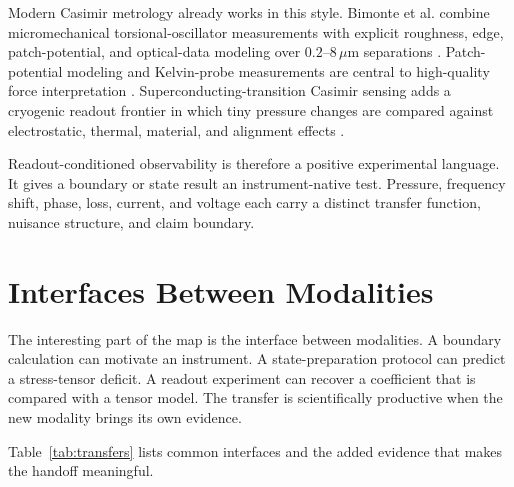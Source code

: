 \documentclass[11pt]{article}
\newcommand{\Tab}{Table}
\newcommand{\um}{\,\mu\mathrm{m}}
\begin{document}
Modern Casimir metrology already works in this style. Bimonte et al. combine
micromechanical torsional-oscillator measurements with explicit roughness,
edge, patch-potential, and optical-data modeling over \(0.2\)--\(8\um\)
separations \cite{Bimonte2021}. Patch-potential modeling and Kelvin-probe
measurements are central to high-quality force interpretation
\cite{Behunin2011,Garrett2015}. Superconducting-transition Casimir sensing
adds a cryogenic readout frontier in which tiny pressure changes are compared
against electrostatic, thermal, material, and alignment effects
\cite{Xu2026}.

Readout-conditioned observability is therefore a positive experimental
language. It gives a boundary or state result an instrument-native test.
Pressure, frequency shift, phase, loss, current, and voltage each carry a
distinct transfer function, nuisance structure, and claim boundary.

\section{Interfaces Between Modalities}

The interesting part of the map is the interface between modalities. A
boundary calculation can motivate an instrument. A state-preparation protocol
can predict a stress-tensor deficit. A readout experiment can recover a
coefficient that is compared with a tensor model. The transfer is
scientifically productive when the new modality brings its own evidence.

\Tab~\ref{tab:transfers} lists common interfaces and the added evidence that
makes the handoff meaningful.
\end{document}
